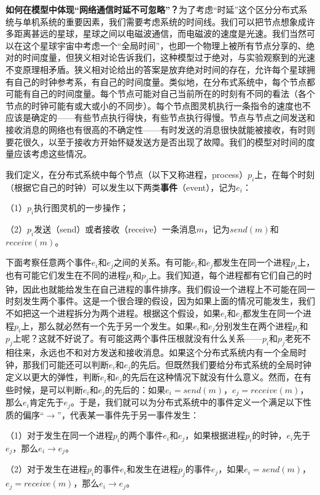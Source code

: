 \documentclass[UTF8,AutoFakeBold=1,AutoFakeSlant,zihao=-4]{cucthesis}
\begin{document}
\textbf{如何在模型中体现“网络通信时延不可忽略”？}为了考虑“时延”这个区分分布式系统与单机系统的重要因素，我们需要考虑系统的时间线。我们可以把节点想象成许多距离甚远的星球，星球之间以电磁波通信，而电磁波的速度是光速。我们当然可以在这个星球宇宙中考虑一个“全局时间”，也即一个物理上被所有节点分享的、绝对的时间度量，但狭义相对论告诉我们，这种模型过于绝对，与实验观察到的光速不变原理相矛盾。狭义相对论给出的答案是放弃绝对时间的存在，允许每个星球拥有自己的时钟参考系，有自己的时间度量。类似地，在分布式系统中，每个节点都可能有自己的时间度量。每个节点可能对自己当前所在的时刻有不同的看法（各个节点的时钟可能有或大或小的不同步）。每个节点图灵机执行一条指令的速度也不应该是确定的——有些节点执行得快，有些节点执行得慢。节点与节点之间发送和接收消息的网络也有很高的不确定性——有时发送的消息很快就能被接收，有时则要花很久，以至于接收方开始怀疑发送方是否出现了故障。我们的模型对时间的度量应该考虑这些情况。

我们定义，在分布式系统中每个节点（以下又称进程，process）$p_i$上，在每个时刻（根据它自己的时钟）可以发生以下两类\textbf{事件}（event），记为$e_i$：

（1）$p_i$执行图灵机的一步操作；

（2）$p_i$发送（send）或者接收（receive）一条消息$m$，记为$send(m)$和$receive(m)$。

下面考察任意两个事件$e_i$和$e_j$之间的关系。有可能$e_i$和$e_j$都发生在同一个进程$p_i$上，也有可能它们发生在不同的进程$p_i$和$p_j$上。我们知道，每个进程都有它们自己的时钟，因此也就能给发生在自己进程的事件排序。我们假设一个进程上不可能在同一时刻发生两个事件。这是一个很合理的假设，因为如果上面的情况可能发生，我们不如把这一个进程拆分为两个进程。根据这个假设，如果$e_i$和$e_j$都发生在同一个进程$p_i$上，那么就必然有一个先于另一个发生。如果$e_i$和$e_j$分别发生在两个进程$p_i$和$p_j$上呢？这就不好说了。有可能这两个事件压根就没有什么关系——$p_i$和$p_j$老死不相往来，永远也不和对方发送和接收消息。如果这个分布式系统内有一个全局时钟，那我们可能还可以判断$e_i$和$e_j$的先后。但既然我们要给分布式系统的全局时钟定义以更大的弹性，判断$e_i$和$e_j$的先后在这种情况下就没有什么意义。然而，在有些时候，是可以判断$e_i$和$e_j$的先后的：如果$e_i = send(m)$，$e_j = receive(m)$，那么$e_i$肯定先于$e_j$。于是，我们就可以为分布式系统中的事件定义一个满足以下性质的偏序“$\rightarrow$”，代表某一事件先于另一事件发生：

（1）对于发生在同一个进程$p_i$的两个事件$e_i$和$e_j$，如果根据进程$p_i$的时钟，$e_i$先于$e_j$，那么$e_i \rightarrow e_j$。

（2）对于发生在进程$p_i$的事件$e_i$和发生在进程$p_j$的事件$e_j$，如果$e_i = send(m)$，$e_j = receive(m)$，那么$e_i \rightarrow e_j$。
\end{document}
